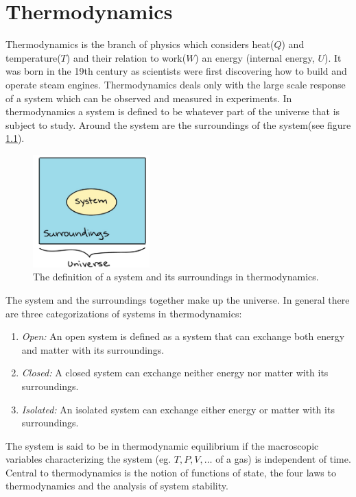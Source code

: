 \chapter{Thermodynamics}
Thermodynamics is the branch of physics which considers heat($Q$) and temperature($T$) and their relation to work($W$) an energy (internal energy, $U$). It was born in the 19th century as scientists were first discovering how to build and operate steam engines. Thermodynamics deals only with the large scale response of a system which can be observed and measured in experiments. In thermodynamics a system is defined to be whatever part of the universe that is subject to study. Around the system are the surroundings of the system(see figure \ref{fig:syst}).
\begin{figure}[H]
	\captionsetup{width=1\textwidth}
	\centering
	\includegraphics[width=0.4\textwidth]{figures/syst}
	\caption{The definition of a system and its surroundings in thermodynamics.}
	\label{fig:syst}
\end{figure}
The system and the surroundings together make up the universe. In general there are three categorizations of systems in thermodynamics:
\begin{enumerate}
	\item \emph{Open:} An open system is defined as a system that can exchange both energy and matter with its surroundings.
	
	\item \emph{Closed:} A closed system can exchange neither energy nor matter with its surroundings.
	
	\item \emph{Isolated:} An isolated system  can exchange either energy or matter with its surroundings.
\end{enumerate}
The system is said to be in thermodynamic equilibrium if the macroscopic variables characterizing the system (eg. $T,P,V,\dots$ of a gas) is independent of time. Central to thermodynamics is the notion of functions of state, the four laws to thermodynamics and the analysis of system stability.

